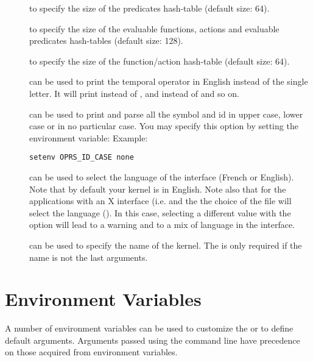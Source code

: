 \begin{description}
\item[] to specify the size of the predicates hash-table
(default size: 64).

\item[] to specify the size of the evaluable functions, actions and
evaluable predicates hash-tables (default size: 128).

\item[] to specify the size of the function/action hash-table
(default size: 64).

\item[] can be used to print the temporal operator in English
instead of the single letter. It will print  instead of \samp{!},
and  instead of \samp{\^{}} and so on.

\item[] can be used to print and parse all the symbol
and id in upper case, lower case or in no particular case. You may specify this
option by setting the  environment variable:\*
Example:
\begin{verbatim}
setenv OPRS_ID_CASE none
\end{verbatim}

\item[] can be used to select the language of the interface
(French or English). Note that by default your kernel is in English. Note also
that for the applications with an X interface (i.e. \XPK{} and the \OPE{} the
choice of the  file will select the language
(). In this case, selecting a
different value with the option will lead to a warning and to a mix of language
in the interface.

\item[] can be used to specify the name of the kernel. The 
is only required if the name is not the last arguments.

\end{description}

\section{\CPK{} Environment Variables}

A number of environment variables can be used to customize the
\CPK{} or to define default arguments. Arguments passed using the command line
have precedence on those acquired from environment variables.

